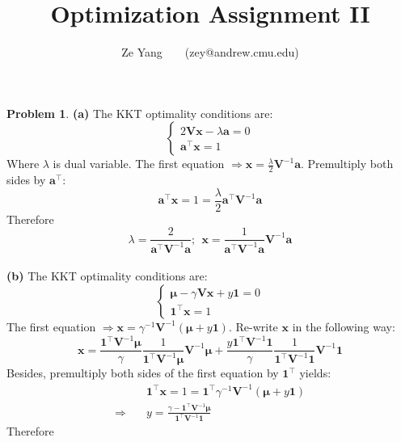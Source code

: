 \documentclass[a4paper, 8pt]{article}
\title{\textbf{Optimization Assignment II}}
\author{Ze Yang~~~~(zey@andrew.cmu.edu)}
\theoremstyle{definition}
\newtheorem{problem}{Problem}
\theoremstyle{hSol}
\begin{document}
\maketitle


\begin{problem} \textbf{(a)}
The KKT optimality conditions are:
\begin{equation}
	\begin{cases}
		2 \bm{Vx} - \lambda \bm{a} = 0 \\
		\bm{a}^{\top} \bm{x} = 1
	\end{cases}
\end{equation}
Where $\lambda$ is dual variable. The first equation $\Rightarrow \bm{x} = \frac{\lambda}{2} \bm{V}^{-1}\bm{a}$. Premultiply both sides by $\bm{a}^{\top}$:
$$
\bm{a}^{\top} \bm{x} = 1 = \frac{\lambda}{2} \bm{a}^{\top}\bm{V}^{-1} \bm{a}
$$
Therefore
\begin{equation}
	\lambda = \frac{2}{\bm{a}^{\top}\bm{V}^{-1} \bm{a}};~~\bm{x} = \frac{1}{\bm{a}^{\top}\bm{V}^{-1} \bm{a}} \bm{V}^{-1}\bm{a}
\end{equation}
~\\
\textbf{(b)} The KKT optimality conditions are:
\begin{equation}
	\begin{cases}
		\bm{\mu} - \gamma \bm{V} \bm{x}+ y \bm{1} = 0 \\
		\bm{1}^{\top} \bm{x} = 1
	\end{cases}
\end{equation}
The first equation $\Rightarrow \bm{x} = \gamma^{-1}\bm{V}^{-1}(\bm{\mu}+ y\bm{1})$. Re-write $\bm{x}$ in the following way:
\begin{equation}
 	\bm{x} = \frac{ \bm{1}^{\top}\bm{V}^{-1}\bm{\mu}}{\gamma} \frac{1}{\bm{1}^{\top}\bm{V}^{-1}\bm{\mu}}\bm{V}^{-1}\bm{\mu}+ \frac{y\bm{1}^{\top}\bm{V}^{-1}\bm{1}}{\gamma}\frac{1}{\bm{1}^{\top}\bm{V}^{-1}\bm{1}} \bm{V}^{-1}\bm{1}
\end{equation} 
Besides, premultiply both sides of the first equation by $\bm{1}^{\top}$ yields:
\begin{equation}
	\begin{split}
		& \bm{1}^{\top} \bm{x} = 1 = \bm{1}^{\top}\gamma^{-1}\bm{V}^{-1}(\bm{\mu}+ y \bm{1})\\
		\Rightarrow \quad & y =  \frac{\gamma - \bm{1}^{\top}\bm{V}^{-1}\bm{\mu}}{\bm{1}^{\top}\bm{V}^{-1} \bm{1}}
	\end{split}
\end{equation}
Therefore
\begin{equation}

\end{equation}
\end{problem}
\end{document}
